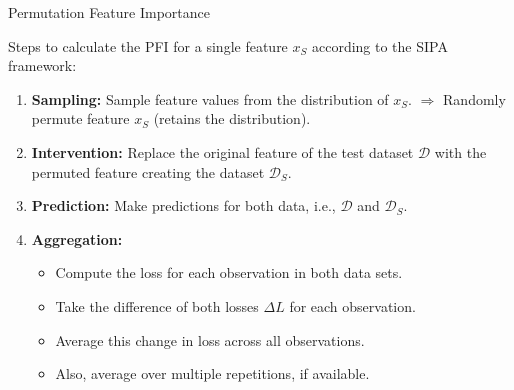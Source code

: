 \documentclass[aspectratio=169]{../latex_main/tntbeamer}  %
\begin{document}
\begin{frame}{Permutation Feature Importance}

Steps to calculate the PFI for a single feature $x_S$ according to the SIPA framework:
\begin{enumerate}
  \item \textbf{Sampling:} Sample feature values from the distribution of $x_S$. \newline $\Rightarrow$ Randomly permute feature $x_S$ (retains the distribution).
  \item \textbf{Intervention:} Replace the original feature of the test dataset $\mathcal{D}$  with the permuted feature  creating the dataset $\mathcal{D}_{S}$.
  \item \textbf{Prediction:} Make predictions for both data, i.e., $\mathcal{D}$ and $\mathcal{D}_{S}$.
  \item \textbf{Aggregation:} 
    \begin{itemize}
      \item Compute the loss for each observation in both data sets.
      \item Take the difference of both losses $\Delta L$ for each observation.
      \item Average this change in loss across all observations.
      \item Also, average over multiple repetitions, if available.
    \end{itemize}
\end{enumerate}
\end{frame}
\end{document}

